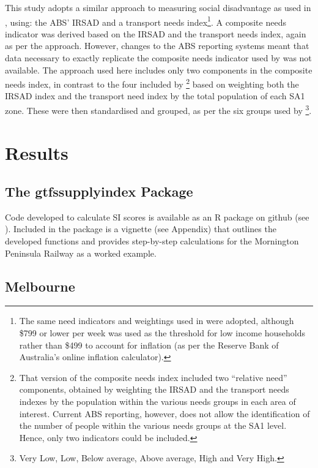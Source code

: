 \documentclass[preprint, 3p,
authoryear]{elsarticle} %
\begin{document}
This study adopts a similar approach to measuring social disadvantage as
used in \citet{currie2010identifying}, using: the ABS' IRSAD and a
transport needs index\footnote{The same need indicators and weightings
  used in \citet{currie2010identifying} were adopted, although \$799 or
  lower per week was used as the threshold for low income households
  rather than \$499 to account for inflation (as per the Reserve Bank of
  Australia's online inflation calculator).}. A composite needs
indicator was derived based on the IRSAD and the transport needs index,
again as per the \citet{currie2010identifying} approach. However,
changes to the ABS reporting systems meant that data necessary to
exactly replicate the composite needs indicator used by
\citet{currie2010identifying} was not available. The approach used here
includes only two components in the composite needs index, in contrast
to the four included by \citet{currie2010identifying}\footnote{That
  version of the composite needs index included two ``relative need''
  components, obtained by weighting the IRSAD and the transport needs
  indexes by the population within the various needs groups in each area
  of interest. Current ABS reporting, however, does not allow the
  identification of the number of people within the various needs groups
  at the SA1 level. Hence, only two indicators could be included.} based
on weighting both the IRSAD index and the transport need index by the
total population of each SA1 zone. These were then standardised and
grouped, as per the six groups used by
\citet{currie2010identifying}\footnote{Very Low, Low, Below average,
  Above average, High and Very High.}.

\section{Results}\label{results}

\subsection{The gtfssupplyindex
Package}\label{the-gtfssupplyindex-package}

Code developed to calculate SI scores is available as an R package on
github (see \citet{gtfssupplyindex_github}). Included in the package is
a vignette (see Appendix) that outlines the developed functions and
provides step-by-step calculations for the Mornington Peninsula Railway
as a worked example.

\subsection{Melbourne}\label{melbourne}
\end{document}
